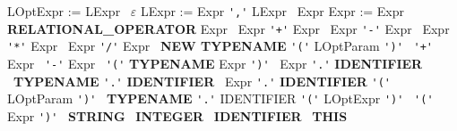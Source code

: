 \documentclass[12pt,a4paper]{article}
\begin{document}
{\sffamily
LOptExpr := LExpr \textbar \ $\varepsilon$ \newline
LExpr := Expr \verb|','| LExpr \textbar \ Expr \newline
Expr := Expr \textbf{RELATIONAL\_OPERATOR} Expr \newline
\hspace*{1em} \textbar \ Expr \verb|'+'| Expr \newline
\hspace*{1em} \textbar \ Expr \verb|'-'| Expr \newline
\hspace*{1em} \textbar \ Expr \verb|'*'| Expr \newline
\hspace*{1em} \textbar \ Expr \verb|'/'| Expr \newline
\hspace*{1em} \textbar \ \textbf{NEW TYPENAME} \verb|'('| LOptParam \verb|')'| \newline
\hspace*{1em} \textbar \ \verb|'+'| Expr \newline
\hspace*{1em} \textbar \ \verb|'-'| Expr \newline
\hspace*{1em} \textbar \ \verb|'('| \textbf{TYPENAME} Expr \verb|')'| \newline
\hspace*{1em} \textbar \ Expr \verb|'.'| \textbf{IDENTIFIER} \newline
\hspace*{1em} \textbar \ \textbf{TYPENAME} \verb|'.'| \textbf{IDENTIFIER} \newline
\hspace*{1em} \textbar \ Expr \verb|'.'| \textbf{IDENTIFIER} \verb|'('| LOptParam \verb|')'| \newline
\hspace*{1em} \textbar \ \textbf{TYPENAME} \verb|'.'| IDENTIFIER \verb|'('| LOptExpr \verb|')'| \newline
\hspace*{1em} \textbar \ \verb|'('| Expr \verb|')'| \newline
\hspace*{1em} \textbar \ \textbf{STRING} \newline
\hspace*{1em} \textbar \ \textbf{INTEGER} \newline
\hspace*{1em} \textbar \ \textbf{IDENTIFIER} \newline
\hspace*{1em} \textbar \ \textbf{THIS}
}
\end{document}

